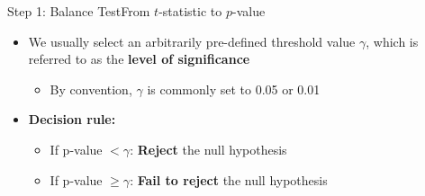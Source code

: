 \documentclass[hyperref={pdfpagelabels=false}]{beamer}
\begin{document}
\begin{frame}{Step 1: Balance Test}{From $t$-statistic to $p$-value}
		
		
		
		\begin{itemize} 
			
	
		\item We usually select an arbitrarily pre-defined threshold value $\gamma$, which is referred to as the \textbf{level of significance}
						\vspace{0.2cm}
		\begin{itemize}	
			\item By convention, $\gamma$ is commonly set to 0.05 or 0.01
						\vspace{0.2cm}
		\end{itemize}
		\item \textbf{Decision rule:}
					\vspace{0.2cm}
		\begin{itemize}
			\item If p-value $< \gamma$: \textbf{Reject} the null hypothesis
			\vspace{0.2cm}
			
			\item If p-value $\geq \gamma$: \textbf{Fail to reject} the null hypothesis
		\end{itemize}	
						
		\end{itemize}	
		
		
		
		
		
		
\end{frame}
\end{document}
